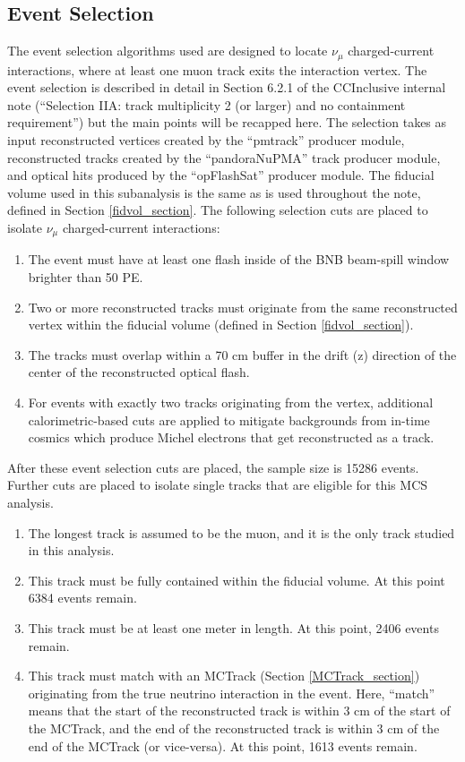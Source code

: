 \subsection{Event Selection}\label{MC_BNB_eventselection_section}
The event selection algorithms used are designed to locate $\nu_\mu$ charged-current interactions, where at least one muon track exits the interaction vertex. The event selection is described in detail in Section 6.2.1 of the {\ub} CCInclusive internal note (``Selection IIA: track multiplicity 2 (or larger) and no containment requirement'')\cite{CCIncInternalNote}  but the main points will be recapped here. The selection takes as input reconstructed vertices created by the ``pmtrack'' producer module, reconstructed tracks created by the ``pandoraNuPMA'' track producer module, and optical hits produced by the ``opFlashSat'' producer module. The fiducial volume used in this subanalysis is the same as is used throughout the note, defined in Section \ref{fidvol_section}. The following selection cuts are placed to isolate $\nu_\mu$ charged-current interactions:
\begin{enumerate}
\item The event must have at least one flash inside of the BNB beam-spill window brighter than 50 PE.
\item Two or more reconstructed tracks must originate from the same reconstructed vertex within the fiducial volume (defined in Section \ref{fidvol_section}).
\item The tracks must overlap within a 70 cm buffer in the drift (z) direction of the center of the reconstructed optical flash.
\item For events with exactly two tracks originating from the vertex, additional calorimetric-based cuts are applied to mitigate backgrounds from in-time cosmics which produce Michel electrons that get reconstructed as a track.
\end{enumerate}
After these event selection cuts are placed, the sample size is 15286 events. Further cuts are placed to isolate single tracks that are eligible for this MCS analysis. 
\begin{enumerate}
\item The longest track is assumed to be the muon, and it is the only track studied in this analysis. 
\item This track must be fully contained within the fiducial volume. At this point 6384 events remain.
\item This track must be at least one meter in length. At this point, 2406 events remain.
\item This track must match with an {\sc MCTrack} (Section \ref{MCTrack_section}) originating from the true neutrino interaction in the event. Here, ``match'' means that the start of the reconstructed track is within 3 cm of the start of the {\sc MCTrack}, and the end of the reconstructed track is within 3 cm of the end of the {\sc MCTrack} (or vice-versa). At this point, 1613 events remain.

\end{enumerate}

